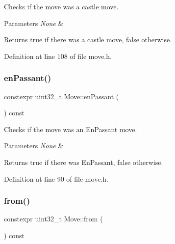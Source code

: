 Checks if the move was a castle move. 


\begin{DoxyParams}{Parameters}
{\em None} & \\
\hline
\end{DoxyParams}
\begin{DoxyReturn}{Returns}
true if there was a castle move, false otherwise. 
\end{DoxyReturn}


Definition at line 108 of file move.\+h.

\mbox{\label{classMove_a69a64f5ba158cf0f48765ea40de0daf0}} 
\subsubsection{\texorpdfstring{en\+Passant()}{enPassant()}}
{\footnotesize\ttfamily constexpr uint32\+\_\+t Move\+::en\+Passant (\begin{DoxyParamCaption}{ }\end{DoxyParamCaption}) const\hspace{0.3cm}{\ttfamily [inline]}}



Checks if the move was an En\+Passant move. 


\begin{DoxyParams}{Parameters}
{\em None} & \\
\hline
\end{DoxyParams}
\begin{DoxyReturn}{Returns}
true if there was En\+Passant, false otherwise. 
\end{DoxyReturn}


Definition at line 90 of file move.\+h.

\mbox{\label{classMove_a5a16b2160e1cb66cde53dd6251616243}} 
\subsubsection{\texorpdfstring{from()}{from()}}
{\footnotesize\ttfamily constexpr uint32\+\_\+t Move\+::from (\begin{DoxyParamCaption}{ }\end{DoxyParamCaption}) const\hspace{0.3cm}{\ttfamily [inline]}}



